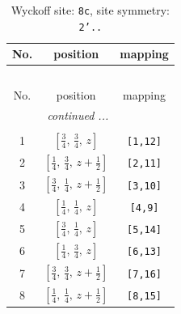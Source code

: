 \documentclass[fleqn,8pt]{jsarticle}
\begin{document}
\renewcommand{\arraystretch}{1.2}
\begin{longtable}{ccc}
\caption{Wyckoff site: {\tt 8c}, site symmetry: {\tt 2'..}}
 \\
 \hline \hline
No. & position & mapping \\ \hline \endfirsthead

\multicolumn{2}{l}{\tablename\ \thetable{}} \\
 \hline \hline
No. & position & mapping \\ \hline \endhead

 \hline \hline
\multicolumn{2}{r}{\footnotesize\it continued ...} \\ \endfoot

 \hline \hline
\multicolumn{2}{r}{} \\ \endlastfoot

1 & $\left[ \frac{3}{4},\, \frac{3}{4},\, z \right]$ & {\tt [1,12]} \\ \hline
2 & $\left[ \frac{1}{4},\, \frac{3}{4},\, z + \frac{1}{2} \right]$ & {\tt [2,11]} \\ \hline
3 & $\left[ \frac{3}{4},\, \frac{1}{4},\, z + \frac{1}{2} \right]$ & {\tt [3,10]} \\ \hline
4 & $\left[ \frac{1}{4},\, \frac{1}{4},\, z \right]$ & {\tt [4,9]} \\ \hline
5 & $\left[ \frac{3}{4},\, \frac{1}{4},\, z \right]$ & {\tt [5,14]} \\ \hline
6 & $\left[ \frac{1}{4},\, \frac{3}{4},\, z \right]$ & {\tt [6,13]} \\ \hline
7 & $\left[ \frac{3}{4},\, \frac{3}{4},\, z + \frac{1}{2} \right]$ & {\tt [7,16]} \\ \hline
8 & $\left[ \frac{1}{4},\, \frac{1}{4},\, z + \frac{1}{2} \right]$ & {\tt [8,15]} \\
\end{longtable}
\renewcommand{\arraystretch}{1.2}
\end{document}
